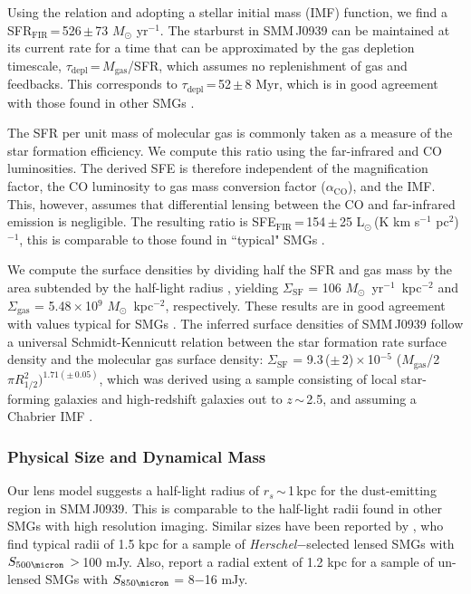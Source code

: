\documentclass[iop, revtex4]{emulateapj}
\newcommand{\Msun}{\mbox{$M_{\odot}$}}
\newcommand{\Lsun}{\mbox{L$_{\odot}$}}
\newcommand{\LpU}{\mbox{K\,\,km\,\,s$^{-1}$\,\,pc$^2$}}
\newcommand{\eg}{{\sl e.g.,~}}
\newcommand{\pmOne}{\mbox{$^{-1}$}}
\begin{document}
Using the \citet{Kennicutt98a} relation and adopting a \citet{Chabrier03a}
stellar initial mass (IMF) function, we find a
SFR$_\textrm{FIR}$\,=\,526\,$\pm$\,73 $M_
\odot$ yr\pmOne.
The starburst in SMM\,J0939 can be maintained at its
current rate for a time that can be approximated by the gas depletion timescale, $\tau_\textrm{depl}$\,=\,$M_\textrm{gas}$/SFR, which assumes no replenishment of gas and feedbacks.
This corresponds to $\tau_\textrm{depl}$\,=\,52\,$\pm$\,8 Myr, which is in good agreement with those found in other SMGs \citep[\eg][]{Greve05a}.

The SFR per unit mass of molecular gas is commonly taken as a
measure of the star formation efficiency.
We compute this ratio using the far-infrared
and CO luminosities. The derived SFE is therefore independent of the magnification factor, the CO luminosity to gas mass conversion factor ($\alpha_\textrm{CO}$), and the
IMF. This, however, assumes that differential lensing between the CO and far-infrared emission is negligible.
The resulting ratio is SFE$_\textrm{FIR}$\,=\,154\,$\pm$\,25\,\,\Lsun\,(\LpU)$^{-1}$, this is comparable
to those found in ``typical" SMGs \citep{Greve05a,Tacconi06a,Riechers11c}.

We compute the surface densities by dividing half the SFR and gas mass by the area subtended by the half-light
radius \citep[\eg][]{Genzel10a, Harrison15a}, yielding
$\Sigma_\textrm{SF}$ = 106  \Msun~yr\pmOne~kpc$^{-2}$ and $\Sigma_\textrm{gas}$ = 5.48\,$\times$\,10$^9$ \Msun~kpc$^{-2}$, respectively.
These results are in good agreement with values typical for SMGs \citep{Tacconi06a, Hodge15a}. 
The inferred surface densities of SMM\,J0939 follow a universal Schmidt-Kennicutt relation between the star formation rate
surface density and the molecular gas surface density: $\Sigma_\textrm{SF}$ = 9.3\,($\pm$\,2)\,$\times$\,10$^{-5}$ ($M_\textrm{gas}$/2$\pi R_\textrm{1/2}^2)^{1.71(\pm\,0.05)}$, which was derived using a sample consisting of local star-forming galaxies and high-redshift
galaxies
out to $z$\,$\sim$\,2.5, and assuming a Chabrier IMF \citep{B07a}.

\subsubsection{Physical Size and Dynamical Mass}
Our lens model suggests a half-light radius of $r_s$\,$\sim$\,1\,kpc for the dust-emitting region in SMM\,J0939. This is comparable to the half-light radii found in other SMGs with high resolution imaging. Similar sizes have been reported by \citet{Bussmann13a}, who find typical radii of 1.5 kpc for a sample of {\it Herschel}$-$selected lensed SMGs with $S_{500\micron}\,>$\,100 mJy.
Also, \citet{Simpson15a} report a radial extent of 1.2 kpc for a sample of un-lensed SMGs with $S_{850\micron}$ = 8$-$16 mJy.
\end{document}
